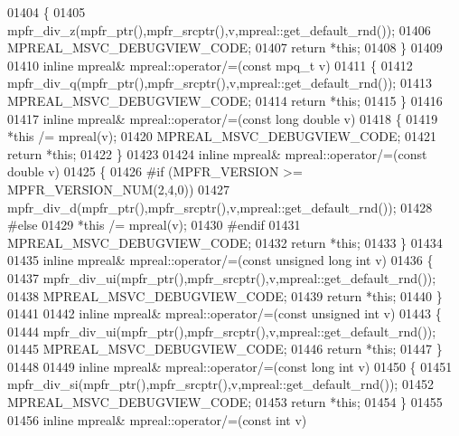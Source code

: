 \begin{DoxyCode}
01404 \{
01405     mpfr\_div\_z(mpfr\_ptr(),mpfr\_srcptr(),v,mpreal::get\_default\_rnd());
01406     MPREAL\_MSVC\_DEBUGVIEW\_CODE;
01407     \textcolor{keywordflow}{return} *\textcolor{keyword}{this};
01408 \}
01409 
01410 \textcolor{keyword}{inline} mpreal& mpreal::operator/=(\textcolor{keyword}{const} mpq\_t v)
01411 \{
01412     mpfr\_div\_q(mpfr\_ptr(),mpfr\_srcptr(),v,mpreal::get\_default\_rnd());
01413     MPREAL\_MSVC\_DEBUGVIEW\_CODE;
01414     \textcolor{keywordflow}{return} *\textcolor{keyword}{this};
01415 \}
01416 
01417 \textcolor{keyword}{inline} mpreal& mpreal::operator/=(\textcolor{keyword}{const} \textcolor{keywordtype}{long} \textcolor{keywordtype}{double} v)
01418 \{
01419     *\textcolor{keyword}{this} /= mpreal(v);
01420     MPREAL\_MSVC\_DEBUGVIEW\_CODE;
01421     \textcolor{keywordflow}{return} *\textcolor{keyword}{this};
01422 \}
01423 
01424 \textcolor{keyword}{inline} mpreal& mpreal::operator/=(\textcolor{keyword}{const} \textcolor{keywordtype}{double} v)
01425 \{
01426 \textcolor{preprocessor}{#if (MPFR\_VERSION >= MPFR\_VERSION\_NUM(2,4,0))}
01427     mpfr\_div\_d(mpfr\_ptr(),mpfr\_srcptr(),v,mpreal::get\_default\_rnd());
01428 \textcolor{preprocessor}{#else}
01429     *\textcolor{keyword}{this} /= mpreal(v);
01430 \textcolor{preprocessor}{#endif}
01431     MPREAL\_MSVC\_DEBUGVIEW\_CODE;
01432     \textcolor{keywordflow}{return} *\textcolor{keyword}{this};
01433 \}
01434 
01435 \textcolor{keyword}{inline} mpreal& mpreal::operator/=(\textcolor{keyword}{const} \textcolor{keywordtype}{unsigned} \textcolor{keywordtype}{long} \textcolor{keywordtype}{int} v)
01436 \{
01437     mpfr\_div\_ui(mpfr\_ptr(),mpfr\_srcptr(),v,mpreal::get\_default\_rnd());
01438     MPREAL\_MSVC\_DEBUGVIEW\_CODE;
01439     \textcolor{keywordflow}{return} *\textcolor{keyword}{this};
01440 \}
01441 
01442 \textcolor{keyword}{inline} mpreal& mpreal::operator/=(\textcolor{keyword}{const} \textcolor{keywordtype}{unsigned} \textcolor{keywordtype}{int} v)
01443 \{
01444     mpfr\_div\_ui(mpfr\_ptr(),mpfr\_srcptr(),v,mpreal::get\_default\_rnd());
01445     MPREAL\_MSVC\_DEBUGVIEW\_CODE;
01446     \textcolor{keywordflow}{return} *\textcolor{keyword}{this};
01447 \}
01448 
01449 \textcolor{keyword}{inline} mpreal& mpreal::operator/=(\textcolor{keyword}{const} \textcolor{keywordtype}{long} \textcolor{keywordtype}{int} v)
01450 \{
01451     mpfr\_div\_si(mpfr\_ptr(),mpfr\_srcptr(),v,mpreal::get\_default\_rnd());
01452     MPREAL\_MSVC\_DEBUGVIEW\_CODE;
01453     \textcolor{keywordflow}{return} *\textcolor{keyword}{this};
01454 \}
01455 
01456 \textcolor{keyword}{inline} mpreal& mpreal::operator/=(\textcolor{keyword}{const} \textcolor{keywordtype}{int} v)

\end{DoxyCode}
